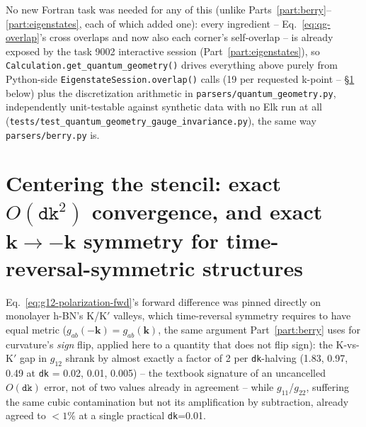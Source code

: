 \documentclass[11pt]{article}
\begin{document}
No new Fortran task was needed for any of this (unlike Parts~\ref{part:berry}--
\ref{part:eigenstates}, each of which added one): every ingredient --
Eq.~\eqref{eq:qg-overlap}'s cross overlaps and now also each corner's self-overlap -- is
already exposed by the task 9002 interactive session (Part~\ref{part:eigenstates}), so
\texttt{Calculation.get\_quantum\_geometry()} drives everything above purely from
Python-side \texttt{EigenstateSession.overlap()} calls (19 per requested k-point --
\S\ref{sec:qg-centering} below) plus the discretization arithmetic in
\texttt{parsers/quantum\_geometry.py}, independently unit-testable against synthetic
data with no Elk run at all
(\texttt{tests/test\_quantum\_geometry\_gauge\_invariance.py}), the same way
\texttt{parsers/berry.py} is.

\section{Centering the stencil: exact $O(\texttt{dk}^2)$ convergence, and exact
$\mathbf k\to-\mathbf k$ symmetry for time-reversal-symmetric structures}
\label{sec:qg-centering}

Eq.~\eqref{eq:g12-polarization-fwd}'s forward difference was pinned directly on
monolayer h-BN's K/K$'$ valleys, which time-reversal symmetry requires to have equal
metric ($g_{ab}(-\mathbf k)=g_{ab}(\mathbf k)$, the same argument Part~\ref{part:berry}
uses for curvature's \emph{sign} flip, applied here to a quantity that does not flip
sign): the K-vs-K$'$ gap in $g_{12}$ shrank by almost exactly a factor of 2 per
\texttt{dk}-halving (1.83, 0.97, 0.49 at \texttt{dk} = 0.02, 0.01, 0.005) -- the textbook
signature of an uncancelled $O(\texttt{dk})$ error, not of two values already in
agreement -- while $g_{11}$/$g_{22}$, suffering the same cubic contamination but not its
amplification by subtraction, already agreed to $<1\%$ at a single practical
\texttt{dk}=0.01.
\end{document}
